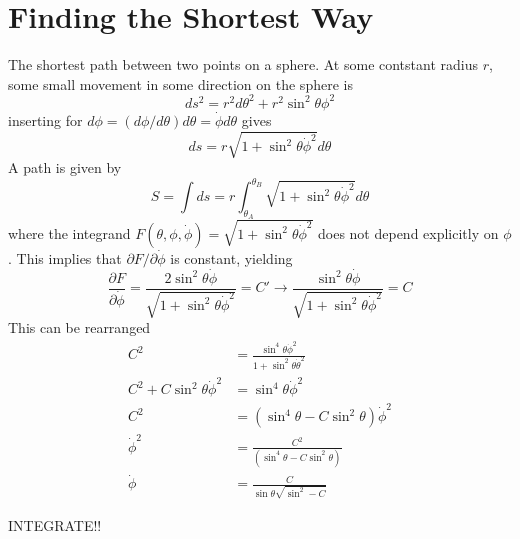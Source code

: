 \documentclass[11pt]{amsart}
\begin{document}
\section{Finding the Shortest Way}
The shortest path between two points on a sphere. At some contstant radius $r$, some small movement in some direction on the sphere is
\begin{equation}
ds^2 = r^2d\theta^2 + r^2\sin^2\theta\phi^2 
\end{equation}
inserting for $d\phi = (d\phi/d\theta)d\theta = \dot{\phi}d\theta$ gives
\begin{equation}
ds = r\sqrt{1 +\sin^2\theta\dot{\phi}^2}d\theta
\end{equation}
A path is given by
\begin{equation}
S = \int ds = r \int_{\theta_A}^{\theta_B} \sqrt{1 + \sin^2\theta\dot{\phi}^2}d\theta
\end{equation}
where the integrand $F(\theta, \phi, \dot{\phi}) = \sqrt{1 + \sin^2\theta\dot{\phi}^2}$ does not depend explicitly on $\phi$. This implies that $\partial F/ \partial \dot{\phi}$ is constant, yielding
\begin{equation}
\frac{\partial F}{\partial \dot{\phi}} = \frac{2\sin^2\theta\dot{\phi}}{\sqrt{1 + \sin^2\theta\dot{\phi}^2}} = C' \rightarrow \frac{\sin^2\theta\dot{\phi}}{\sqrt{1 + \sin^2\theta\dot{\phi}^2}} = C  
\end{equation}
This can be rearranged
\begin{align*}
C^2 &= \frac{\sin^4\theta\dot{\phi}^2}{1 + \sin^2\theta\dot{\theta}^2} \\
C^2 + C\sin^2\theta\dot{\phi}^2 &= \sin^4\theta\dot{\phi}^2 \\
C^2 &= (\sin^4\theta - C\sin^2\theta)\dot{\phi}^2 \\
\dot{\phi}^2 &= \frac{C^2}{(\sin^4\theta - C\sin^2\theta)} \\
\dot{\phi} &= \frac{C}{\sin\theta\sqrt{\sin^2 - C}}
\end{align*}

INTEGRATE!!
\end{document}
